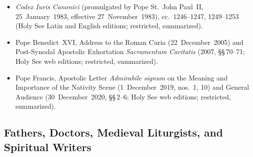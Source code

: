 \begin{itemize}
\textit{Liturgical Calendar for the Dioceses of the United States of America}
(2026, Miscellaneous Notes; restricted, summarized).
\item \textit{Codex Iuris Canonici} (promulgated by Pope St.~John Paul~II,
25~January~1983, effective 27~November~1983), cc.~1246--1247, 1249--1253 (Holy
See Latin and English editions; restricted, summarized).
\item Pope Benedict~XVI, Address to the Roman Curia (22~December~2005) and
Post-Synodal Apostolic Exhortation \textit{Sacramentum Caritatis} (2007,
\S\S\,70--71; Holy See web editions; restricted, summarized).
\item Pope Francis, Apostolic Letter \textit{Admirabile signum} on the Meaning
and Importance of the Nativity Scene (1~December~2019, nos.~1, 10) and General
Audience (30~December~2020, \S\S\,2--6; Holy See web editions; restricted,
summarized).
\end{itemize}

\subsection{Fathers, Doctors, Medieval Liturgists, and Spiritual Writers}

